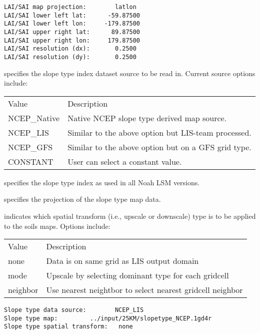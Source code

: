  \begin{Verbatim}[frame=single]
LAI/SAI map projection:        latlon
LAI/SAI lower left lat:      -59.87500
LAI/SAI lower left lon:     -179.87500
LAI/SAI upper right lat:      89.87500
LAI/SAI upper right lon:     179.87500
LAI/SAI resolution (dx):       0.2500
LAI/SAI resolution (dy):       0.2500
 \end{Verbatim}


 
  specifies the slope type index 
 dataset source to be read in. Current source options include:

 \begin{tabular}{ll}
 Value       & Description    \\
 NCEP\_Native  &  Native NCEP slope type derived map source. \\
 NCEP\_LIS     &  Similar to the above option but LIS-team processed. \\
 NCEP\_GFS     &  Similar to the above option but on a GFS grid type. \\
 CONSTANT      &  User can select a constant value.  \\
 \end{tabular}

  specifies the slope type index as used in
 all Noah LSM versions.

  specifies the projection of the
 slope type map data.

  indicates which spatial transform
 (i.e., upscale or downscale) type is to be applied to the soils
 maps.  Options include:

 \begin{tabular}{ll}
 Value    & Description                                          \\
 none     & Data is on same grid as LIS output domain            \\
 mode     & Upscale by selecting dominant type for each gridcell \\
 neighbor & Use nearest neightbor to select nearest gridcell neighbor \\
 \end{tabular}
 

 \begin{Verbatim}[frame=single]
Slope type data source:        NCEP_LIS
Slope type map:         ../input/25KM/slopetype_NCEP.1gd4r
Slope type spatial transform:   none
 \end{Verbatim}

